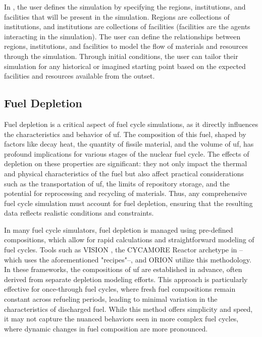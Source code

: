 
In \cyclus, the user defines the simulation by specifying the regions,
institutions, and facilities that will be present in the simulation. Regions
are collections of institutions, and institutions are collections of facilities
(facilities are the agents interacting in the simulation). The user can define
the relationships between regions, institutions, and facilities to model the
flow of materials and resources through the simulation. Through initial
conditions, the user can tailor their simulation for any historical or imagined
starting point based on the expected facilities and resources available from
the outset.

\subsection{Fuel Depletion}
\label{sec:depletion}

Fuel depletion is a critical aspect of fuel cycle simulations, as it directly
influences the characteristics and behavior of \gls{uf}. The composition of
this fuel, shaped by factors like decay heat, the quantity of fissile material,
and the volume of \gls{uf}, has profound implications for various stages of the
nuclear fuel cycle. The effects of depletion on these properties are
significant: they not only impact the thermal and physical characteristics of
the fuel but also affect practical considerations such as the transportation of
\gls{uf}, the limits of repository storage, and the potential for reprocessing
and recycling of materials. Thus, any comprehensive fuel cycle simulation must
account for fuel depletion, ensuring that the resulting data reflects realistic
conditions and constraints.

In many fuel cycle simulators, fuel depletion is managed using pre-defined
compositions, which allow for rapid calculations and straightforward modeling
of fuel cycles. Tools such as VISION \cite{yacout_visionverifiable_2006}, the
CYCAMORE Reactor archetype in \cyclus--which uses the aforementioned
"recipes"--, and ORION utilize this methodology. In these frameworks, the
compositions of \gls{uf} are established in advance, often derived from
separate depletion modeling efforts. This approach is particularly effective
for once-through fuel cycles, where fresh fuel compositions remain constant
across refueling periods, leading to minimal variation in the characteristics
of discharged fuel. While this method offers simplicity and speed, it may not
capture the nuanced behaviors seen in more complex fuel cycles, where dynamic
changes in fuel composition are more pronounced.

